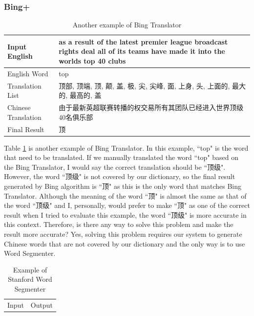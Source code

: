 \begin{CJK}{UTF8}{gbsn}
\subsubsection{Bing+}
\begin{table}[ht]
    \caption{Another example of Bing Translator}
    \label{table:bing_plus_1}
    \begin{center}
    \begin{tabular}{| p{2.5cm} | p{4cm} |}
        \hline
        Input English & as a result of the latest premier league broadcast rights deal all of its teams have made it into the worlds top 40 clubs\\
        \hline
        English Word & top \\
        \hline
        Translation List & \parbox[t]{4cm}{顶部, 顶端, 顶, 颠, 盖, 极, 尖, 尖峰, 面, 上身, 头, 上面的, 最大的, 最高的, 盖}\\
        \hline
        Chinese Translation & 由于最新英超联赛转播的权交易所有其团队已经进入世界顶级40名俱乐部\\
        \hline
        Final Result & 顶\\
        \hline
    \end{tabular}
    \end{center}
\end{table}
Table \ref{table:bing_plus_1} is another example of Bing Translator. In this example, ``top" is the word that need to be translated. If we manually translated the word ``top" based on the Bing Translator, I would say the correct translation should be ``顶级". However, the word ``顶级" is not covered by our dictionary, so the final result generated by Bing algorithm is ``顶" as this is the only word that matches Bing Translator. Although the meaning of the word ``顶" is almost the same as that of the word ``顶级" and I, personally, would prefer to make ``顶" as one of the correct result when I tried to evaluate this example, the word ``顶级" is more accurate in this context. Therefore, is there any way to solve this problem and make the result more accurate? Yes, solving this problem requires our system to generate Chinese words that are not covered by our dictionary and the only way is to use Word Segmenter.
\\
\begin{table}[ht]
    \caption{Example of Stanford Word Segmenter}
    \label{table:bing_plus_2}
    \begin{tabular}{| p{3.5cm} | p{3.5cm} |}
        \hline
        Input & Output\\

\end{tabular}
\end{table}
\end{CJK}
